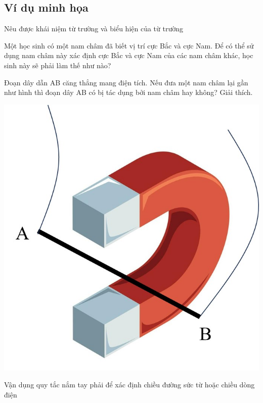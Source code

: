 \subsection{Ví dụ minh họa}
\begin{dang}{Nêu được khái niệm từ trường và biểu hiện của từ trường}
\end{dang}
\begin{vd}
	Một học sinh có một nam châm đã biết vị trí cực Bắc và cực Nam. Để có thể sử dụng nam châm này xác định cực Bắc và cực Nam của các nam châm khác, học sinh này sẽ phải làm thế như nào?
\end{vd}
\begin{vd}
	Đoạn dây dẫn AB căng thẳng mang điện tích. Nếu đưa một nam châm lại gần như hình thì đoạn dây AB có bị tác dụng bởi nam châm hay không? Giải thích.
	\begin{center}
		\includegraphics[width=0.25\linewidth]{figs/VN12-Y24-PH-SYL-017-7}
	\end{center}
\end{vd}
\begin{dang}{Vận dụng quy tắc nắm tay phải để xác định chiều đường sức từ hoặc chiều dòng điện}
	\end{dang}
